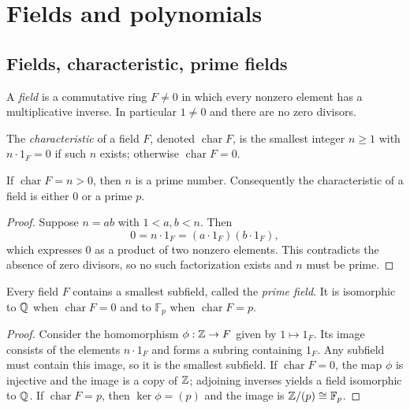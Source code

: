 \section{Fields and polynomials}\label{sec:fields-polynomials}

\subsection{Fields, characteristic, prime fields}
\begin{definition}
A \emph{field} is a commutative ring $F\neq0$ in which every nonzero element has a multiplicative inverse. In particular $1\neq0$ and there are no zero divisors.
\end{definition}

\begin{definition}[Characteristic]
The \emph{characteristic} of a field $F$, denoted $\operatorname{char}F$, is the smallest integer $n\ge1$ with $n\cdot1_F=0$ if such $n$ exists; otherwise $\operatorname{char}F=0$.
\end{definition}

\begin{proposition}\label{prop:char}
If $\operatorname{char}F=n>0$, then $n$ is a prime number. Consequently the characteristic of a field is either $0$ or a prime $p$.
\end{proposition}
\begin{proof}
Suppose $n=ab$ with $1<a,b<n$. Then
\[
0=n\cdot1_F=(a\cdot1_F)(b\cdot1_F),
\]
which expresses $0$ as a product of two nonzero elements. This contradicts the absence of zero divisors, so no such factorization exists and $n$ must be prime.
\end{proof}

\begin{proposition}\label{prop:prime-field}
Every field $F$ contains a smallest subfield, called the \emph{prime field}. It is isomorphic to $\mathbb{Q}$ when $\operatorname{char}F=0$ and to $\mathbb{F}_p$ when $\operatorname{char}F=p$.
\end{proposition}
\begin{proof}
Consider the homomorphism $\phi: \mathbb{Z}\to F$ given by $1\mapsto1_F$. Its image consists of the elements $n\cdot1_F$ and forms a subring containing $1_F$. Any subfield must contain this image, so it is the smallest subfield. If $\operatorname{char}F=0$, the map $\phi$ is injective and the image is a copy of $\mathbb{Z}$; adjoining inverses yields a field isomorphic to $\mathbb{Q}$. If $\operatorname{char}F=p$, then $\ker\phi=(p)$ and the image is $\mathbb{Z}/(p)\cong\mathbb{F}_p$.
\end{proof}

